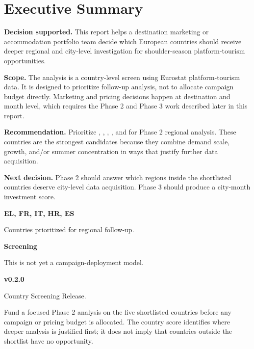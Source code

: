 \section{Executive Summary}

\begin{executivesummary}
\textbf{Decision supported.} This report helps a destination marketing or accommodation portfolio team decide which European countries should receive deeper regional and city-level investigation for shoulder-season platform-tourism opportunities.

\textbf{Scope.} The analysis is a country-level screen using Eurostat platform-tourism data. It is designed to prioritize follow-up analysis, not to allocate campaign budget directly. Marketing and pricing decisions happen at destination and month level, which requires the Phase 2 and Phase 3 work described later in this report.

\textbf{Recommendation.} Prioritize , , , , and  for Phase 2 regional analysis. These countries are the strongest candidates because they combine demand scale, growth, and/or summer concentration in ways that justify further data acquisition.

\textbf{Next decision.} Phase 2 should answer which regions inside the shortlisted countries deserve city-level data acquisition. Phase 3 should produce a city-month investment score.
\end{executivesummary}

\begin{tcbitemize}[raster columns=3,raster equal height,raster column skip=3mm]
  \par
  {\sffamily\Large\bfseries\color{VMIBurgundy}EL, FR, IT, HR, ES}\par
  {\footnotesize\color{VMIWarmGray}Countries prioritized for regional follow-up.}

  \par
  {\sffamily\Large\bfseries\color{VMIBurgundy}Screening}\par
  {\footnotesize\color{VMIWarmGray}This is not yet a campaign-deployment model.}

  \par
  {\sffamily\Large\bfseries\color{VMIBurgundy}v0.2.0}\par
  {\footnotesize\color{VMIWarmGray}Country Screening Release.}
\end{tcbitemize}

\begin{recommendation}
Fund a focused Phase 2 analysis on the five shortlisted countries before any campaign or pricing budget is allocated. The country score identifies where deeper analysis is justified first; it does not imply that countries outside the shortlist have no opportunity.
\end{recommendation}
